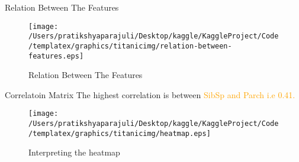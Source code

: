 \documentclass[
 size=14pt,
 paper=smartboard,  %
 mode=present, 		%
 display=slides, 	%
 style=tuliplab,  	%
 pauseslide,
 fleqn,leqno]{powerdot}
\begin{document}
\begin{slide}[toc=,bm=]{Relation Between The Features}
\begin{figure}
  \centering
  \centerline{\texttt{[image: /Users/pratikshyaparajuli/Desktop/kaggle/KaggleProject/Code/templatex/graphics/titanicimg/relation-between-features.eps]}}
  \caption{Relation Between The Features}\label{fig:Heat map}
\end{figure}
\end{slide}


\begin{slide}[toc=,bm=]{Correlatoin Matrix}
 The highest correlation is between \textcolor{orange}{SibSp and Parch i.e 0.41.}
  \begin{figure}
    \centering
    \centerline{\texttt{[image: /Users/pratikshyaparajuli/Desktop/kaggle/KaggleProject/Code/templatex/graphics/titanicimg/heatmap.eps]}}
    \caption{Interpreting the heatmap}\label{fig:Heat map}
  \end{figure}
  \end{slide}
  
  


\end{document}
